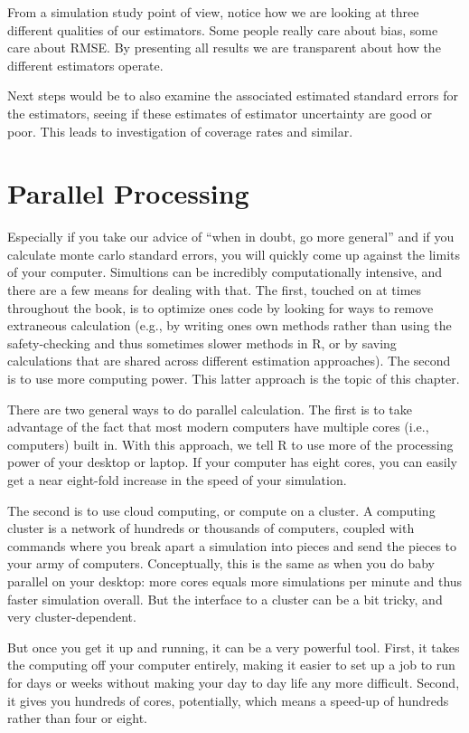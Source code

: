 \documentclass[
]{book}
\begin{document}
From a simulation study point of view, notice how we are looking at three
different qualities of our estimators. Some people really care about bias,
some care about RMSE. By presenting all results we are transparent about how
the different estimators operate.

Next steps would be to also examine the associated estimated standard errors
for the estimators, seeing if these estimates of estimator uncertainty are
good or poor. This leads to investigation of coverage rates and similar.

\hypertarget{parallel-processing}{%
\chapter{Parallel Processing}\label{parallel-processing}}

Especially if you take our advice of ``when in doubt, go more general'' and if you calculate monte carlo standard errors, you will quickly come up against the limits of your computer.
Simultions can be incredibly computationally intensive, and there are a few means for dealing with that.
The first, touched on at times throughout the book, is to optimize ones code by looking for ways to remove extraneous calculation (e.g., by writing ones own methods rather than using the safety-checking and thus sometimes slower methods in R, or by saving calculations that are shared across different estimation approaches).
The second is to use more computing power.
This latter approach is the topic of this chapter.

There are two general ways to do parallel calculation.
The first is to take advantage of the fact that most modern computers have multiple cores (i.e., computers) built in.
With this approach, we tell R to use more of the processing power of your desktop or laptop.
If your computer has eight cores, you can easily get a near eight-fold increase in the speed of your simulation.

The second is to use cloud computing, or compute on a cluster.
A computing cluster is a network of hundreds or thousands of computers, coupled with commands where you break apart a simulation into pieces and send the pieces to your army of computers.
Conceptually, this is the same as when you do baby parallel on your desktop: more cores equals more simulations per minute and thus faster simulation overall.
But the interface to a cluster can be a bit tricky, and very cluster-dependent.

But once you get it up and running, it can be a very powerful tool.
First, it takes the computing off your computer entirely, making it easier to set up a job to run for days or weeks without making your day to day life any more difficult.
Second, it gives you hundreds of cores, potentially, which means a speed-up of hundreds rather than four or eight.
\end{document}
